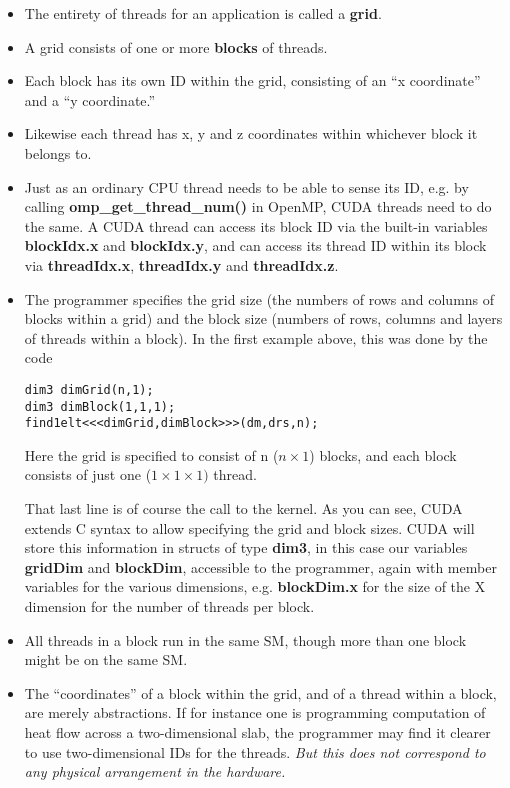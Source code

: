 \begin{itemize}

\item The entirety of threads for an application is called a {\bf grid}.  

\item A grid consists of one or more {\bf blocks} of threads.

\item Each block has its own ID within the grid, consisting of an ``x
coordinate'' and a ``y coordinate.''  

\item Likewise each thread has x, y and z coordinates within whichever
block it belongs to.  

\item Just as an ordinary CPU thread needs to be able to sense its ID, e.g.
by calling {\bf omp\_get\_thread\_num()} in OpenMP, CUDA threads need
to do the same.  A CUDA thread can access its block ID via the built-in
variables {\bf blockIdx.x} and {\bf blockIdx.y}, and can access its
thread ID within its block via {\bf threadIdx.x}, {\bf threadIdx.y} and
{\bf threadIdx.z}.

\item The programmer specifies the grid size (the numbers of rows and
columns of blocks within a grid) and the block size (numbers of rows,
columns and layers of threads within a block).  In the first example
above, this was done by the code

\begin{Verbatim}[fontsize=\relsize{-2}]
dim3 dimGrid(n,1);
dim3 dimBlock(1,1,1);
find1elt<<<dimGrid,dimBlock>>>(dm,drs,n);
\end{Verbatim}

Here the grid is specified to consist of n ($n \times 1$) blocks,
and each block consists of just one ($1 \times 1 \times 1)$ thread.

That last line is of course the call to the kernel.  As you can see,
CUDA extends C syntax to allow specifying the grid and block sizes.
CUDA will store this information in structs of type {\bf dim3}, in this
case our variables {\bf gridDim} and {\bf blockDim}, accessible to the
programmer, again with member variables for the various dimensions, e.g.
{\bf blockDim.x} for the size of the X dimension for the number of
threads per block.

\item All threads in a block run in the same SM, though more than
one block might be on the same SM.

\item The ``coordinates'' of a block within the grid, and of a thread
within a block, are merely abstractions.  If for instance one is
programming computation of heat flow across a two-dimensional slab, the
programmer may find it clearer to use two-dimensional IDs for the
threads.  {\it But this does not correspond to any physical arrangement
in the hardware.}

\end{itemize}

